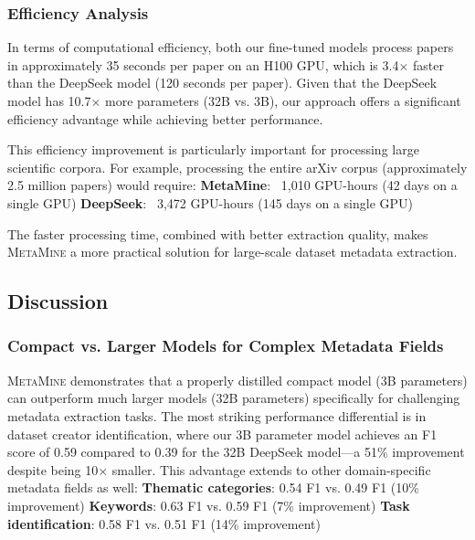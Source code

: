 \documentclass[runningheads]{llncs}
\begin{document}
\subsubsection{Efficiency Analysis}

In terms of computational efficiency, both our fine-tuned models process papers in approximately 35 seconds per paper on an H100 GPU, which is 3.4× faster than the DeepSeek model (120 seconds per paper). Given that the DeepSeek model has 10.7× more parameters (32B vs. 3B), our approach offers a significant efficiency advantage while achieving better performance.

This efficiency improvement is particularly important for processing large scientific corpora. For example, processing the entire arXiv corpus (approximately 2.5 million papers) would require:
    \textbf{ MetaMine}: ~1,010 GPU-hours (42 days on a single GPU)
    \textbf{ DeepSeek}: ~3,472 GPU-hours (145 days on a single GPU)


The faster processing time, combined with better extraction quality, makes \textsc{MetaMine} a more practical solution for large-scale dataset metadata extraction.

\subsection{Discussion}





\subsubsection{Compact vs. Larger Models for Complex Metadata Fields}

\textsc{MetaMine} demonstrates that a properly distilled compact model (3B parameters) can outperform much larger models (32B parameters) specifically for challenging metadata extraction tasks. The most striking performance differential is in dataset creator identification, where our 3B parameter model achieves an F1 score of 0.59 compared to 0.39 for the 32B DeepSeek model—a 51\% improvement despite being 10× smaller.
This advantage extends to other domain-specific metadata fields as well:
    \textbf{ Thematic categories}: 0.54 F1 vs. 0.49 F1 (10\% improvement)
    \textbf{ Keywords}: 0.63 F1 vs. 0.59 F1 (7\% improvement)
    \textbf{ Task identification}: 0.58 F1 vs. 0.51 F1 (14\% improvement)
\end{document}
